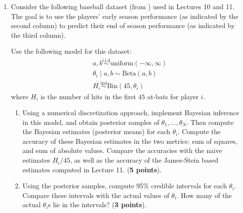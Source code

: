 \documentclass{scrartcl}
\begin{document}
\begin{enumerate}
\begin{enumerate}
\begin{equation}
\begin{split}
      \beta) \\
  & X_i \mid \theta_i \sim \text{Poisson}(n_i \theta_i).
    \end{split}
    \end{equation}
    for some suitable uninformative priors for $\alpha$ and
    $\beta$. What uninformative priors would you use and why?
  Without using any probabilistic programming library, implement
  Bayesian inference in this model, and compute posterior mean
  estimates of $\theta_1, \dots, \theta_N$. You can use the
  discretization based approach discussed in class for the
  Beta-Binomial model. (\textbf{5 points})
\item Use PyMC (or some other library) to obtain posterior samples for
  the model \eqref{fullBayes}, and use these samples to compute the
  posterior mean esimates of $\theta_1, \dots, \theta_N$. Compare the
  posterior means with those obtained in part (d) above. (\textbf{3
    points}) 
    \end{enumerate}
  \item Consider the following baseball dataset (from \citet[Chapter
    1]{Efron}) used in Lectures 10 and 11. The goal is to use the
    players' early season performance (as indicated by the second
    column) to predict their end of season performance (as indicated
    by the third column).

    Use the following model for this dataset:
\begin{align*}
 & a, b \overset{\text{i.i.d}}{\sim} \text{uniform}(-\infty, \infty) \\
 & \theta_i \mid a, b \sim \text{Beta}(a, b) \\
 & H_i \overset{\text{ind}}{\sim} \text{Bin}(45, \theta_i)
\end{align*}
where $H_i$ is the number of hits in the first $45$ at-bats for player
$i$. 

\begin{enumerate}
\item Using a numerical discretization approach, implement Bayesian
  inference in this model, and obtain posterior samples of $\theta_1,
  \dots, \theta_N$. Then compute the Bayesian estimates (posterior
  means) for each $\theta_i$. Compute the accuracy of these Bayesian
  estimates in the two metrics: sum of squares, and sum of absolute
  values. Compare the accuracies with the naive estimates $H_i/45$, as
  well as the accuracy of the James-Stein based estimates computed in
  Lecture 11. (\textbf{5 points}).
\item Using the posterior samples, compute 95\% credible intervals for
  each $\theta_i$. Compare these intervals with the actual values of
  $\theta_i$. How many of the actual $\theta_i$s lie in the intervals?
  (\textbf{3 points}). 
\end{enumerate}


\end{enumerate}
\end{document}
